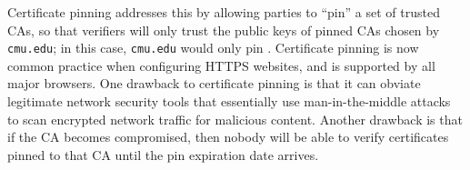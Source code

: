 \documentclass[11pt,twoside]{scrartcl}
\begin{document}
Certificate pinning addresses this by allowing parties to ``pin'' a set of trusted CAs, so that verifiers will only trust the public keys of pinned CAs chosen by \verb'cmu.edu'; in this case, \verb'cmu.edu' would only pin \tca. Certificate pinning is now common practice when configuring HTTPS websites, and is supported by all major browsers. One drawback to certificate pinning is that it can obviate legitimate network security tools that essentially use man-in-the-middle attacks to scan encrypted network traffic for malicious content. Another drawback is that if the CA becomes compromised, then nobody will be able to verify certificates pinned to that CA until the pin expiration date arrives.


\end{document}
